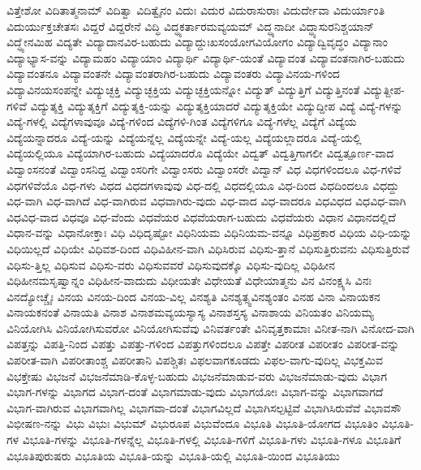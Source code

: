 {ವಿತ್ತೇಶೋ
ವಿದಿತಾತ್ಮನಾಮ್
ವಿದಿತ್ವಾ
ವಿದಿತ್ವೈನಂ
ವಿದುಃ
ವಿದುರ
ವಿದುರಾಸುರಾಃ
ವಿದುರ್ದೇವಾ
ವಿದುರ್ಯಾಂತಿ
ವಿದುರ್ಯುಕ್ತಚೇತಸಃ
ವಿದ್ದರೆ
ವಿದ್ದರೇನೆ
ವಿದ್ಧಿ
ವಿದ್ಧ್ಯಕರ್ತಾರಮವ್ಯಯಮ್
ವಿದ್ಧ್ಯನಾದೀ
ವಿದ್ಧ್ಯಾಸುರನಿಶ್ಚಯಾನ್
ವಿದ್ಧ್ಯೇನಮಿಹ
ವಿದ್ಯತೇ
ವಿದ್ಯಾದಾನವಿರ-ಬಹುದು
ವಿದ್ಯಾದ್ದುಃಖಸಂಯೋಗವಿಯೋಗಂ
ವಿದ್ಯಾದ್ವಿವೃದ್ಧಂ
ವಿದ್ಯಾನಾಂ
ವಿದ್ಯಾಭ್ಯಾಸ-ವನ್ನು
ವಿದ್ಯಾಮಹಂ
ವಿದ್ಯಾಯಾಂ
ವಿದ್ಯಾರ್ಥಿ
ವಿದ್ಯಾರ್ಥಿ-ಯಂತೆ
ವಿದ್ಯಾವಂತ
ವಿದ್ಯಾವಂತನಾಗಿರ-ಬಹುದು
ವಿದ್ಯಾವಂತನೂ
ವಿದ್ಯಾವಂತನೇ
ವಿದ್ಯಾವಂತರಾಗಿರ-ಬಹುದು
ವಿದ್ಯಾವಂತರು
ವಿದ್ಯಾವಿನಯ-ಗಳಿಂದ
ವಿದ್ಯಾವಿನಯಸಂಪನ್ನೇ
ವಿದ್ಯುಚ್ಛಕ್ತಿ
ವಿದ್ಯುಚ್ಛಕ್ತಿಯ
ವಿದ್ಯುಚ್ಛಕ್ತಿಯನ್ನೋ
ವಿದ್ಯುತ್
ವಿದ್ಯುತ್ತಿಗೆ
ವಿದ್ಯುತ್ತಿನಂತೆ
ವಿದ್ಯುತ್ದೀಪ-ಗಳಿವೆ
ವಿದ್ಯುತ್ಶಕ್ತಿ
ವಿದ್ಯುತ್ಶಕ್ತಿಗೆ
ವಿದ್ಯುತ್ಶಕ್ತಿ-ಯನ್ನು
ವಿದ್ಯುತ್ಶಕ್ತಿಯಾದರೆ
ವಿದ್ಯುತ್ಶಕ್ತಿಯೇ
ವಿದ್ಯುದ್ದೀಪ
ವಿದ್ಯೆ
ವಿದ್ಯೆ-ಗಳನ್ನು
ವಿದ್ಯೆ-ಗಳಲ್ಲಿ
ವಿದ್ಯೆಗಳಾವುವೂ
ವಿದ್ಯೆ-ಗಳಿಂದ
ವಿದ್ಯೆಗಳಿ-ಗಿಂತ
ವಿದ್ಯೆಗಳಿಗೂ
ವಿದ್ಯೆ-ಗಳೆಲ್ಲ
ವಿದ್ಯೆಗೆ
ವಿದ್ಯೆಯ
ವಿದ್ಯೆಯನ್ನಾದರೂ
ವಿದ್ಯೆ-ಯನ್ನು
ವಿದ್ಯೆಯನ್ನೆಲ್ಲ
ವಿದ್ಯೆಯನ್ನೇ
ವಿದ್ಯೆ-ಯಲ್ಲ
ವಿದ್ಯೆಯಲ್ಲಾದರೂ
ವಿದ್ಯೆ-ಯಲ್ಲಿ
ವಿದ್ಯೆಯಲ್ಲಿಯೂ
ವಿದ್ಯೆಯಾಗಿರ-ಬಹುದು
ವಿದ್ಯೆಯಾದರೊ
ವಿದ್ಯೆಯೇ
ವಿದ್ವತ್
ವಿದ್ವತ್ತಿಗಾಗಲೀ
ವಿದ್ವತ್ಪೂರ್ಣ-ವಾದ
ವಿದ್ವಾಂಸನಂತೆ
ವಿದ್ವಾಂಸನಿದ್ದ
ವಿದ್ವಾಂಸರಿಗೇ
ವಿದ್ವಾಂಸರು
ವಿದ್ವಾಂಸರೇ
ವಿದ್ವಾನ್
ವಿಧ
ವಿಧಗಳಿಂದಲೂ
ವಿಧ-ಗಳಿವೆ
ವಿಧಗಳಿವೆಯೊ
ವಿಧ-ಗಳು
ವಿಧದ
ವಿಧದಗಳಾವುವು
ವಿಧ-ದಲ್ಲಿ
ವಿಧದಲ್ಲಿಯೂ
ವಿಧ-ದಿಂದ
ವಿಧದಿಂದಲೂ
ವಿಧದ್ದು
ವಿಧ-ವಾಗಿ
ವಿಧ-ವಾಗಿದೆ
ವಿಧ-ವಾಗಿರುವ
ವಿಧವಾಗಿರು-ವುದು
ವಿಧ-ವಾದ
ವಿಧ-ವಾದರೂ
ವಿಧವಿಧದ
ವಿಧವಿಧ-ವಾಗಿ
ವಿಧವಿಧ-ವಾದ
ವಿಧವೂ
ವಿಧ-ವೆಂದು
ವಿಧವೆಯರ
ವಿಧವೆಯರಾಗ-ಬಹುದು
ವಿಧವೆಯರು
ವಿಧಾನ
ವಿಧಾನದಲ್ಲಿದೆ
ವಿಧಾನ-ವನ್ನು
ವಿಧಾನೋಕ್ತಾಃ
ವಿಧಿ
ವಿಧಿದೃಷ್ಟೋ
ವಿಧಿನಿಯಮ
ವಿಧಿನಿಯಮ-ವನ್ನೂ
ವಿಧಿಪ್ರಕಾರ
ವಿಧಿಯ
ವಿಧಿ-ಯನ್ನು
ವಿಧಿಯಿಲ್ಲದೆ
ವಿಧಿಯೇ
ವಿಧಿವಶ-ದಿಂದ
ವಿಧಿವಿಹೀನ-ವಾಗಿ
ವಿಧಿಸಿರುವ
ವಿಧಿಸು-ತ್ತಾನೆ
ವಿಧಿಸುತ್ತಿರುವನು
ವಿಧಿಸುತ್ತಿರುವೆ
ವಿಧಿಸು-ತ್ತಿಲ್ಲ
ವಿಧಿಸುವ
ವಿಧಿಸು-ವರು
ವಿಧಿಸುವವರೆ
ವಿಧಿಸುವುದಕ್ಕೊ
ವಿಧಿಸು-ವುದಿಲ್ಲ
ವಿಧಿಹೀನ
ವಿಧಿಹೀನಮಸೃಷ್ವಾನ್ನಂ
ವಿಧಿಹೀನ-ವಾದುದು
ವಿಧೀಯತೇ
ವಿಧೇಯತೆ
ವಿಧೇಯಾತ್ಮನು
ವಿನ
ವಿನಂಕ್ಷ್ಯಸಿ
ವಿನಃ
ವಿನದ್ಯೋಚ್ಚೈಃ
ವಿನಯ
ವಿನಯ-ದಿಂದ
ವಿನಯ-ವಿಲ್ಲ
ವಿನಶ್ಯತಿ
ವಿನಶ್ಯತ್ಸ್ವವಿನಶ್ಯಂತಂ
ವಿನಹ
ವಿನಾ
ವಿನಾಯಕನ
ವಿನಾಯಕನಂತೆ
ವಿನಾಯತಿ
ವಿನಾಶ
ವಿನಾಶಮವ್ಯಯಸ್ಯಾಸ್ಯ
ವಿನಾಶಸ್ತಸ್ಯ
ವಿನಾಶಾಯ
ವಿನಿಯತಂ
ವಿನಿಯಮ್ಯ
ವಿನಿಯೋಗಿಸಿ
ವಿನಿಯೋಗಿಸುವರೋ
ವಿನಿಯೋಗಿಸುವೆವು
ವಿನಿವರ್ತಂತೇ
ವಿನಿವೃತ್ತಕಾಮಾಃ
ವಿನೀತ-ನಾಗಿ
ವಿನೋದ-ವಾಗಿ
ವಿಪತ್ತನ್ನು
ವಿಪತ್ತಿ-ನಿಂದ
ವಿಪತ್ತು
ವಿಪತ್ತು-ಗಳಿಂದ
ವಿಪತ್ತುಗಳಿಂದಲೂ
ವಿಪತ್ತೇ
ವಿಪರೀತ
ವಿಪರೀತಂ
ವಿಪರೀತ-ವನ್ನು
ವಿಪರೀತ-ವಾಗಿ
ವಿಪರೀತಾಂಶ್ಚ
ವಿಪರೀತಾನಿ
ವಿಪಶ್ಚಿತಃ
ವಿಫಲವಾಗಕೂಡದು
ವಿಫಲ-ವಾಗು-ವುದಿಲ್ಲ
ವಿಭಕ್ತಮಿವ
ವಿಭಕ್ತೇಷು
ವಿಭಜನೆ
ವಿಭಜನೆಮಾಡಿ-ಕೊಳ್ಳ-ಬಹುದು
ವಿಭಜನೆಮಾಡುವ-ವರು
ವಿಭಜನೆಮಾಡು-ವುದು
ವಿಭಾಗ
ವಿಭಾಗ-ಗಳನ್ನು
ವಿಭಾಗದ
ವಿಭಾಗ-ದಂತೆ
ವಿಭಾಗಮಾಡು-ವುದು
ವಿಭಾಗಯೋಃ
ವಿಭಾಗ-ವನ್ನು
ವಿಭಾಗವಾಗದೆ
ವಿಭಾಗ-ವಾಗಿರುವ
ವಿಭಾಗವಾಗಿಲ್ಲ
ವಿಭಾಗವಾ-ದಂತೆ
ವಿಭಾಗವಿಲ್ಲದೆ
ವಿಭಾಗಿಸಲ್ಪಟ್ಟಿವೆ
ವಿಭಾಗಿಸಿರುವೆವೆ
ವಿಭಾವಸೌ
ವಿಭೀಷಣ-ನನ್ನು
ವಿಭು
ವಿಭುಃ
ವಿಭುಮ್
ವಿಭುರೂಪ
ವಿಭುವೆಂದೂ
ವಿಭೂತಿ
ವಿಭೂತಿ-ಯೋಗದ
ವಿಭೂತಿಂ
ವಿಭೂತಿ-ಗಳ
ವಿಭೂತಿ-ಗಳನ್ನು
ವಿಭೂತಿ-ಗಳನ್ನೆಲ್ಲ
ವಿಭೂತಿ-ಗಳಲ್ಲಿ
ವಿಭೂತಿ-ಗಳಿಗೆ
ವಿಭೂತಿ-ಗಳು
ವಿಭೂತಿ-ಗಳೂ
ವಿಭೂತಿಗೆ
ವಿಭೂತಿಪುರುಷರು
ವಿಭೂತಿಯ
ವಿಭೂತಿ-ಯನ್ನು
ವಿಭೂತಿ-ಯಲ್ಲಿ
ವಿಭೂತಿ-ಯಿಂದ
ವಿಭೂತಿಯು
}
